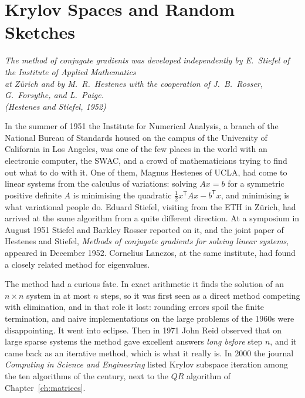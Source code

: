 \chapter{Krylov Spaces and Random Sketches}\label{ch:krylov}

\begin{center}\itshape
The method of conjugate gradients was developed independently by E.~Stiefel of the Institute of Applied Mathematics\\
at Z\"urich and by M.~R.~Hestenes with the cooperation of J.~B.~Rosser, G.~Forsythe, and L.~Paige.\\
\upshape(Hestenes and Stiefel, 1952)
\end{center}

In the summer of 1951 the Institute for Numerical Analysis, a branch of the National Bureau of Standards housed on the campus of the University of
California in Los Angeles, was one of the few places in the world with an electronic computer, the SWAC, and a crowd of mathematicians trying to
find out what to do with it. One of them, Magnus Hestenes of UCLA, had come to linear systems from the calculus of variations: solving $Ax=b$ for a
symmetric positive definite $A$ is minimising the quadratic $\frac12x^{\mathsf T}Ax-b^{\mathsf T}x$, and minimising is what variational people do.
Eduard Stiefel, visiting from the ETH in Z\"urich, had arrived at the same algorithm from a quite different direction. At a symposium in August 1951
Stiefel and Barkley Rosser reported on it, and the joint paper of Hestenes and Stiefel, \emph{Methods of conjugate gradients for solving linear
systems}, appeared in December 1952. Cornelius Lanczos, at the same institute, had found a closely related method for eigenvalues.

The method had a curious fate. In exact arithmetic it finds the solution of an $n\times n$ system in at most $n$ steps, so it was first seen as a
direct method competing with elimination, and in that role it lost: rounding errors spoil the finite termination, and naive implementations on the
large problems of the 1960s were disappointing. It went into eclipse. Then in 1971 John Reid observed that on large sparse systems the method gave
excellent answers \emph{long before} step $n$, and it came back as an iterative method, which is what it really is. In 2000 the journal \emph{Computing in
Science and Engineering} listed Krylov subspace iteration among the ten algorithms of the century, next to the $QR$ algorithm of Chapter~\ref{ch:matrices}.

